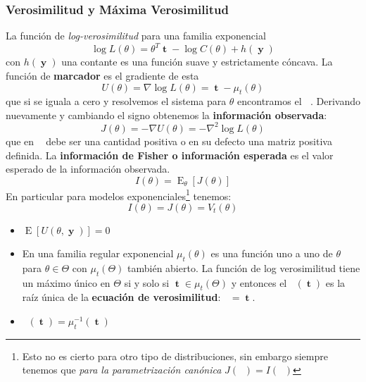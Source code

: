 \documentclass[pdftex,11pt,a4paper]{article}
\DeclareMathOperator{\muestra}{\mathbf{y}}
\DeclareMathOperator{\MLE}{\mathbf{\hat{\theta}}_{MLE}}
\DeclareMathOperator{\that}{\mathbf{\hat{\theta}}}
\DeclareMathOperator{\est}{\mathbf{t}}
\DeclareMathOperator{\E}{E}
\DeclareMathOperator*{\valmed}{\mu_t(\theta)}
\begin{document}
\subsubsection{Verosimilitud y Máxima Verosimilitud}
La función de \emph{log-verosimilitud} para una familia exponencial $$\log L(\theta) = \theta^T \est - \log C(\theta) + h(\muestra)$$ con $h(\muestra)$ una contante es una función suave y estrictamente cóncava. La función de \textbf{marcador} es el gradiente de esta $$U(\theta) = \nabla \log L(\theta) = \est - \mu_t(\theta)$$ que si se iguala a cero y resolvemos el sistema para $\theta$ encontramos el $\MLE$. Derivando nuevamente y cambiando el signo obtenemos la \textbf{información observada}:$$J(\theta) = - \nabla U(\theta) = - \nabla^2 \log L(\theta)$$ que en $\that$ debe ser una cantidad positiva o en su defecto una matriz positiva definida. La \textbf{información de Fisher o información esperada} es el valor esperado de la información observada. $$I(\theta) = \E_\theta[J(\theta)]$$ En particular para modelos exponenciales\footnote{Esto no es cierto para otro tipo de distribuciones, sin embargo siempre tenemos que \emph{para la parametrización canónica} $J(\that) = I(\that)$} tenemos:
$$I(\theta) = J(\theta) = V_t(\theta)$$
\begin{itemize}
	\item $\E[U(\theta,\muestra)] = 0$
	\item En una familia regular exponencial $\mu_t(\theta)$ es una función uno a uno de $\theta$ para $\theta \in \Theta$ con $\mu_t(\Theta)$ también abierto. La función de log verosimilitud tiene un máximo único en $\Theta$ si y solo si $\est \in \mu_t(\Theta)$ y entonces el $\MLE(\est)$ es la raíz única de la \textbf{ecuación de verosimilitud}: $\valmed = \est$.
	\item $\MLE(\est) = \mu_t^{-1}(\est)$
\end{itemize}
\end{document}
